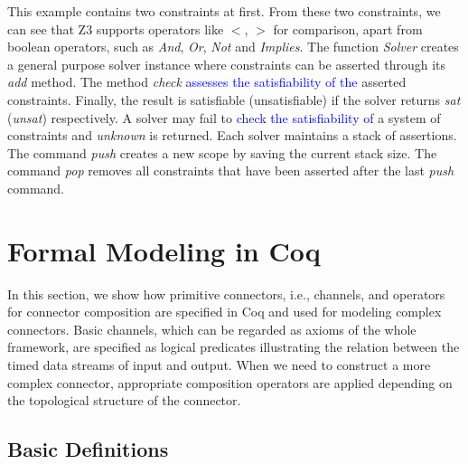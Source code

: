\documentclass[preprint,3p]{elsarticle}
\newcommand{\liyi}[1]{\textcolor{blue}{#1}}
\newcommand{\xy}[1]{{#1}}
\begin{document}
This example contains two constraints at first. From these two constraints, \xy{we can see that Z3 supports operators like $<$, $>$ for comparison, apart from boolean operators, such as \emph{And}, \emph{Or}, \emph{Not} and \emph{Implies}.}
The function \emph{Solver} creates a general purpose solver instance where constraints can be asserted through its \emph{add} method. The method \emph{check} \liyi{assesses the satisfiability of the} asserted constraints. \xy{Finally, the result is satisfiable (unsatisfiable) if the solver returns \emph{sat} (\emph{unsat}) respectively.} A solver may fail to \liyi{check the satisfiability of} a system of constraints and \emph{unknown} is returned. Each solver maintains a stack of assertions. The command \emph{push} creates a new scope by saving the current stack size. The command \emph{pop} removes all constraints that have been asserted after the last \emph{push} command.


\section{Formal Modeling in Coq}\label{sec:channelandoperator}
In this section, we show how primitive connectors, i.e., channels, and operators for connector composition are specified in Coq and used for \xy{modeling complex connectors. }Basic channels, which can be regarded as axioms of the whole framework, are specified as logical predicates illustrating the relation between the timed data streams of input and output. When we need to construct a more complex connector, appropriate composition operators are applied depending on the topological structure of the connector.

\subsection{Basic Definitions}\label{sec:basicdef}

\end{document}
